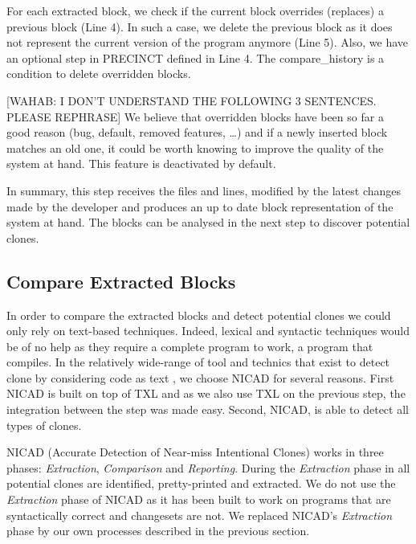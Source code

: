 \documentclass[conference]{IEEEtran}
\begin{document}
For each extracted block, we check if the current block overrides (replaces) a previous block (Line 4).
In such a case, we delete the previous block as it does not represent the current version of the program anymore (Line 5).
Also, we have an optional step in PRECINCT defined in Line 4. The compare\_history is a condition to delete overridden blocks.

[WAHAB: I DON'T UNDERSTAND THE FOLLOWING 3 SENTENCES. PLEASE REPHRASE]
We believe that overridden blocks have been so far a good reason (bug, default, removed features, \ldots) and if a newly inserted block matches an old one, it could be worth knowing to improve the quality of the system at hand.
This feature is deactivated by default.

In summary, this step receives the files and lines, modified by the latest changes made by the developer and produces an up to date block representation of the system at hand. The blocks can be analysed in the next step to discover potential clones.

\subsection{Compare Extracted Blocks}
\label{sub:Compare Extracted Blocks}

In order to compare the extracted blocks and detect potential clones we could only rely on text-based techniques.
Indeed, lexical and syntactic techniques would be of no help as they require a complete program to work, a program that compiles.
In the relatively wide-range of tool and technics that exist to detect clone by considering code as text \cite{Johnson1993,Johnson1994,Marcus,Manber1994,StephaneDucasse,Wettel2005}, we choose NICAD \cite{Cordy2011} for several reasons.
First NICAD is built on top of TXL and as we also use TXL on the previous step, the integration between the step was made easy.
Second, NICAD, is able to detect all types of clones.

NICAD (Accurate Detection of Near-miss Intentional Clones) works in three phases: \textit{Extraction}, \textit{Comparison} and \textit{Reporting}.
During the \textit{Extraction} phase in all potential clones are identified, pretty-printed and extracted.
We do not use the \textit{Extraction} phase of NICAD as it has been built to work on programs that are syntactically correct and changesets are not.
We replaced NICAD's \textit{Extraction} phase by our own processes described in the previous section.
\end{document}
